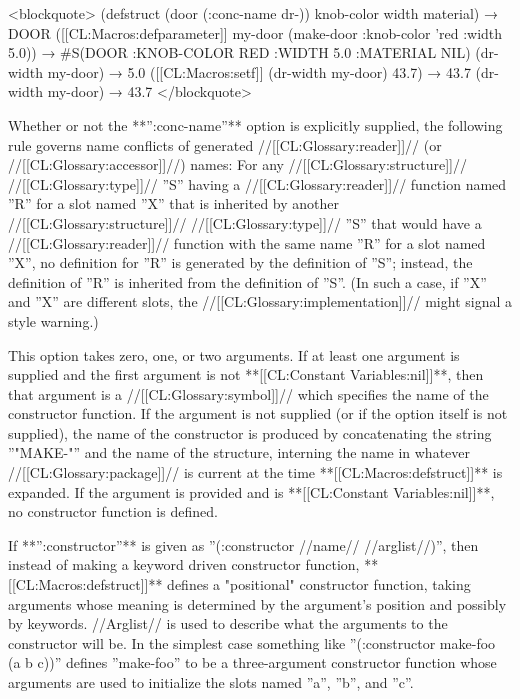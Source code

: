 <blockquote> (defstruct (door (:conc-name dr-)) knob-color width material) → DOOR ([[CL:Macros:defparameter]] my-door (make-door :knob-color 'red :width 5.0)) → #S(DOOR :KNOB-COLOR RED :WIDTH 5.0 :MATERIAL NIL) (dr-width my-door) → 5.0 ([[CL:Macros:setf]] (dr-width my-door) 43.7) → 43.7 (dr-width my-door) → 43.7 </blockquote>

Whether or not the **'':conc-name''** option is explicitly supplied, the following rule governs name conflicts of generated //[[CL:Glossary:reader]]// (or //[[CL:Glossary:accessor]]//) names: For any //[[CL:Glossary:structure]]// //[[CL:Glossary:type]]// ''S'' having a //[[CL:Glossary:reader]]// function named ''R'' for a slot named ''X'' that is inherited by another //[[CL:Glossary:structure]]// //[[CL:Glossary:type]]// ''S'' that would have a //[[CL:Glossary:reader]]// function with the same name ''R'' for a slot named ''X'', no definition for ''R'' is generated by the definition of ''S''; instead, the definition of ''R'' is inherited from the definition of ''S''. (In such a case, if ''X'' and ''X'' are different slots, the //[[CL:Glossary:implementation]]// might signal a style warning.)


This option takes zero, one, or two arguments. If at least one argument is supplied and the first argument is not **[[CL:Constant Variables:nil]]**, then that argument is a //[[CL:Glossary:symbol]]// which specifies the name of the constructor function. If the argument is not supplied (or if the option itself is not supplied), the name of the constructor is produced by concatenating the string ''"MAKE-"'' and the name of the structure, interning the name in whatever //[[CL:Glossary:package]]// is current at the time **[[CL:Macros:defstruct]]** is expanded. If the argument is provided and is **[[CL:Constant Variables:nil]]**, no constructor function is defined.

If **'':constructor''** is given as ''(:constructor //name// //arglist//)'', then instead of making a keyword driven constructor function, **[[CL:Macros:defstruct]]** defines a "positional" constructor function, taking arguments whose meaning is determined by the argument's position and possibly by keywords. //Arglist// is used to describe what the arguments to the constructor will be. In the simplest case something like ''(:constructor make-foo (a b c))'' defines ''make-foo'' to be a three-argument constructor function whose arguments are used to initialize the slots named ''a'', ''b'', and ''c''.

